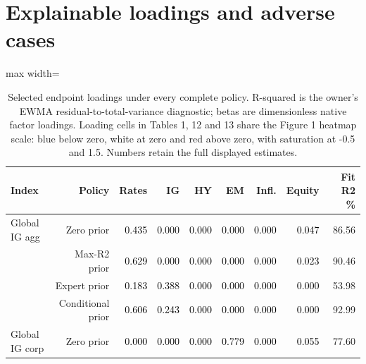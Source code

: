 \documentclass[a4paper,review]{cas-sc}
\begin{document}
\section{Explainable loadings and adverse cases}

\begin{table}[pos=htbp]
\centering
\small
\caption{Selected endpoint loadings under every complete policy. R-squared is the owner's EWMA residual-to-total-variance diagnostic; betas are dimensionless native factor loadings. Loading cells in Tables 1, 12 and 13 share the Figure 1 heatmap scale: blue below zero, white at zero and red above zero, with saturation at -0.5 and 1.5. Numbers retain the full displayed estimates.}
\begin{adjustbox}{max width=\linewidth}
\begin{tabular}{lrrrrrrrr}
\toprule
Index & Policy & Rates & IG & HY & EM & Infl. & Equity & Fit R2 \% \\
\midrule
Global IG agg & Zero prior & \cellcolor[HTML]{F9C2A7}\textcolor{black}{0.435} & \cellcolor[HTML]{FFFFFF}\textcolor{black}{0.000} & \cellcolor[HTML]{FFFFFF}\textcolor{black}{0.000} & \cellcolor[HTML]{FFFFFF}\textcolor{black}{0.000} & \cellcolor[HTML]{FFFFFF}\textcolor{black}{0.000} & \cellcolor[HTML]{F8F2EF}\textcolor{black}{0.047} & 86.56 \\
 & Max-R2 prior & \cellcolor[HTML]{F19E7D}\textcolor{black}{0.629} & \cellcolor[HTML]{FFFFFF}\textcolor{black}{0.000} & \cellcolor[HTML]{FFFFFF}\textcolor{black}{0.000} & \cellcolor[HTML]{FFFFFF}\textcolor{black}{0.000} & \cellcolor[HTML]{FFFFFF}\textcolor{black}{0.000} & \cellcolor[HTML]{F7F5F4}\textcolor{black}{0.023} & 90.46 \\
 & Expert prior & \cellcolor[HTML]{FBE6DA}\textcolor{black}{0.183} & \cellcolor[HTML]{FACAB1}\textcolor{black}{0.388} & \cellcolor[HTML]{FFFFFF}\textcolor{black}{0.000} & \cellcolor[HTML]{FFFFFF}\textcolor{black}{0.000} & \cellcolor[HTML]{FFFFFF}\textcolor{black}{0.000} & \cellcolor[HTML]{FFFFFF}\textcolor{black}{0.000} & 53.98 \\
 & Conditional prior & \cellcolor[HTML]{F3A481}\textcolor{black}{0.606} & \cellcolor[HTML]{FCE0D0}\textcolor{black}{0.243} & \cellcolor[HTML]{FFFFFF}\textcolor{black}{0.000} & \cellcolor[HTML]{FFFFFF}\textcolor{black}{0.000} & \cellcolor[HTML]{FFFFFF}\textcolor{black}{0.000} & \cellcolor[HTML]{FFFFFF}\textcolor{black}{0.000} & 92.99 \\
Global IG corp & Zero prior & \cellcolor[HTML]{FFFFFF}\textcolor{black}{0.000} & \cellcolor[HTML]{FFFFFF}\textcolor{black}{0.000} & \cellcolor[HTML]{FFFFFF}\textcolor{black}{0.000} & \cellcolor[HTML]{E27B62}\textcolor{black}{0.779} & \cellcolor[HTML]{FFFFFF}\textcolor{black}{0.000} & \cellcolor[HTML]{F8F2EF}\textcolor{black}{0.055} & 77.60 \\

\end{tabular}
\end{adjustbox}
\end{table}
\end{document}
